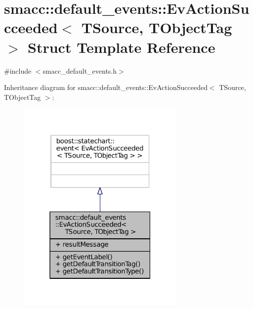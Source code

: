 \hypertarget{structsmacc_1_1default__events_1_1EvActionSucceeded}{}\section{smacc\+:\+:default\+\_\+events\+:\+:Ev\+Action\+Succeeded$<$ T\+Source, T\+Object\+Tag $>$ Struct Template Reference}
\label{structsmacc_1_1default__events_1_1EvActionSucceeded}


{\ttfamily \#include $<$smacc\+\_\+default\+\_\+events.\+h$>$}



Inheritance diagram for smacc\+:\+:default\+\_\+events\+:\+:Ev\+Action\+Succeeded$<$ T\+Source, T\+Object\+Tag $>$\+:
\nopagebreak
\begin{figure}[H]
\begin{center}
\leavevmode
\includegraphics[width=232pt]{structsmacc_1_1default__events_1_1EvActionSucceeded__inherit__graph}
\end{center}
\end{figure}


